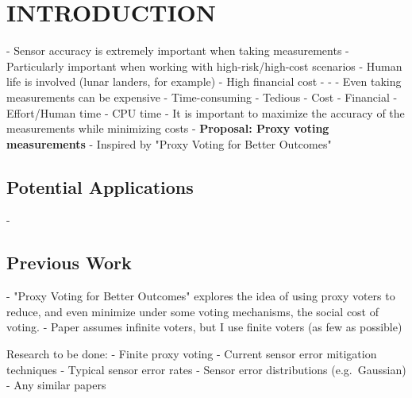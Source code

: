 %
%

\chapter{INTRODUCTION}\label{ch:introduction}
\thispagestyle{empty}

- Sensor accuracy is extremely important when taking measurements
- Particularly important when working with high-risk/high-cost scenarios
    - Human life is involved (lunar landers, for example)
    - High financial cost
    - %
    - %
- Even taking measurements can be expensive
    - Time-consuming
    - Tedious
    - Cost
        - Financial
        - Effort/Human time
        - CPU time
- It is important to maximize the accuracy of the measurements while minimizing
  costs
    - \textbf{Proposal: Proxy voting measurements}
        - Inspired by "Proxy Voting for Better Outcomes"\cite{Cohensius2017}

\section{Potential Applications}\label{sec:potential_applications}
- %


\section{Previous Work}\label{sec:previous_work}
- "Proxy Voting for Better Outcomes"\cite{Cohensius2017} explores the idea of
  using proxy voters to reduce, and even minimize under some voting mechanisms,
  the social cost of voting.
    - Paper assumes infinite voters, but I use finite voters (as few as possible)

Research to be done:
- Finite proxy voting
- Current sensor error mitigation techniques
- Typical sensor error rates
- Sensor error distributions (e.g.\ Gaussian)
- Any similar papers

